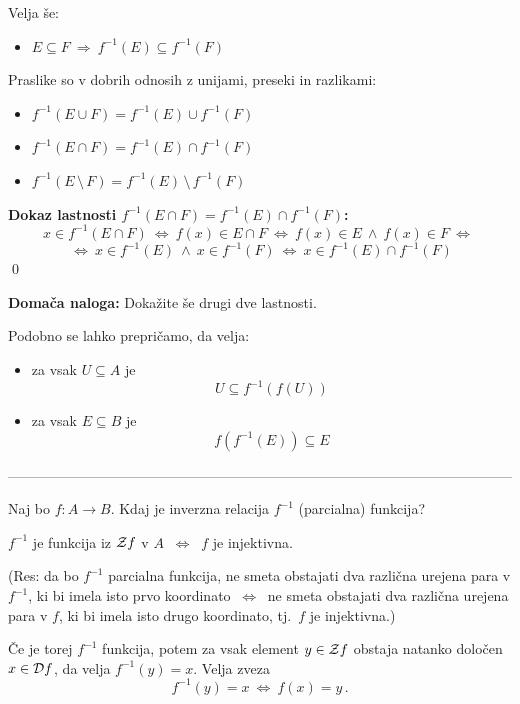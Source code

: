 \documentclass[11pt,paper=b5,footinclude,headinclude]{scrbook} %
\def\inn {{~\wedge~}}
\def\sledi {{~\Rightarrow~}}
\def\brez {{\,\setminus\,}}
\def\cee {{~\Leftrightarrow~}}
\begin{document}
\bigskip
Velja še:
\begin{itemize}
  \item $E\subseteq F\sledi f^{-1}(E)\subseteq f^{-1}(F)$
\end{itemize}

\bigskip
Praslike so v dobrih odnosih z unijami, preseki in razlikami:
\begin{itemize}
  \item $f^{-1}(E\cup F)= f^{-1}(E)\cup f^{-1}(F)$
  \item $f^{-1}(E\cap F)= f^{-1}(E)\cap f^{-1}(F)$
  \item $f^{-1}(E\brez F)= f^{-1}(E)\brez f^{-1}(F)$
\end{itemize}

\textbf{ Dokaz lastnosti $f^{-1}(E\cap F)= f^{-1}(E)\cap f^{-1}(F)$:}
$$x\in f^{-1}(E\cap F)\cee
f(x)\in E\cap F\cee
f(x)\in E \inn f(x)\in F\cee$$ $$\cee x\in f^{-1}(E) \inn x\in f^{-1}(F)
\cee x\in f^{-1}(E)\cap f^{-1}(F)$$
\qed

\textbf{ Domača naloga:} Dokažite še drugi dve lastnosti.

\bigskip
Podobno se lahko prepričamo, da velja:
\begin{itemize}
  \item za vsak $U\subseteq A$ je $$U\subseteq f^{-1}(f(U))$$
  \item za vsak $E\subseteq B$ je $$f(f^{-1}(E))\subseteq E$$
\end{itemize}

\bigskip

------------------------------------------------------------------------------------------------------------

\bigskip

Naj bo $f:A\to B$. Kdaj je inverzna relacija $f^{-1}$ (parcialna) funkcija?

\medskip
$f^{-1}$ je funkcija iz ${\cal Z}f$ v $A$ $\cee$ $f$ je injektivna.

(Res: da bo $f^{-1}$ parcialna funkcija, ne smeta obstajati dva različna urejena para v $f^{-1}$, ki bi imela isto prvo koordinato $\cee$ ne smeta obstajati dva različna urejena para v $f$, ki bi imela isto drugo koordinato, tj.~$f$ je injektivna.)



Če je torej $f^{-1}$ funkcija, potem za vsak element $y\in {\cal Z}f$  obstaja natanko določen $x\in {\cal D}f$, da velja
$f^{-1}(y) = x$. Velja zveza
$$f^{-1}(y) = x\cee f(x) = y\,.$$
\end{document}
